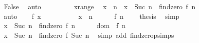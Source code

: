 \begin{isabellebody}
\begin{figure}
\begin{minipage}{0.8\textwidth}
\ False\ \isamarkupfalse%
\ auto\isanewline
\ \ \isamarkupfalse%
\isanewline
\ \ \isanewline
\ \ \isamarkupfalse%
\ x{}range\ \isamarkupfalse%
\ {}x\ {}\ n\ {}\ x\ {}\ {}Suc\ n\ {}{}{}\ findzero\ f\ n{}{}\ \isamarkupfalse%
\ auto\isanewline
\ \ \isamarkupfalse%
\ {}f\ x\ {}\ {}{}\isanewline
\ \ \isamarkupfalse%
\isanewline
\ \ \ \ \isamarkupfalse%
\ {}x\ {}\ n{}\isanewline
\ \ \ \ \isamarkupfalse%
\ {}f\ n\ {}\ {}{}\ \isamarkupfalse%
\ {}thesis\ \isamarkupfalse%
\ simp\isanewline
\ \ \isamarkupfalse%
\isanewline
\ \ \ \ \isamarkupfalse%
\ {}x\ {}\ {}Suc\ n\ {}{}{}\ findzero\ f\ n{}{}\isanewline
\ \ \ \ \isamarkupfalse%
\ dom\ \ {}f\ n\ {}\ {}{}\ \isamarkupfalse%
\ {}x\ {}\ {}Suc\ n\ {}{}{}\ findzero\ f\ {}Suc\ n{}{}{}\ \isamarkupfalse%
\ {}simp\ add{}\ findzero{}psimps{}\isanewline

\end{minipage}
\end{figure}
\end{isabellebody}
